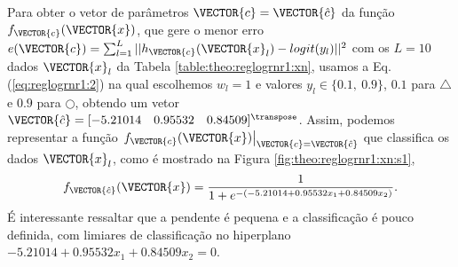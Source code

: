 \begin{SolutionT}\label{sol:theo:reglogrnr1:s1}
Para obter o vetor de parâmetros $\VECTOR{c}=\VECTOR{\hat{c}}$ da função $f_{\VECTOR{c}}(\VECTOR{x})$, 
que gere o menor erro $e(\VECTOR{c}) =  \sum_{l=1}^{L} ||h_{\VECTOR{c}}(\VECTOR{x}_l)-logit(y_l)||^2$
com os $L=10$ dados $\VECTOR{x}_l$ da Tabela \ref{table:theo:reglogrnr1:xn},
usamos a Eq. (\ref{eq:reglogrnr1:2}) na qual escolhemos $w_l=1$ e valores $y_l \in \{0.1,~ 0.9\}$,
$0.1$ para $\bigtriangleup$ e $0.9$ para $\bigcirc$,
obtendo um vetor $\VECTOR{\hat{c}}=[-5.21014\quad 0.95532\quad 0.84509]^{\transpose}$.
Assim, podemos representar a função $\left.f_{\VECTOR{c}}(\VECTOR{x})\right|_{\VECTOR{c}=\VECTOR{\hat{c}}}$
 que classifica os dados $\VECTOR{x}_l$, 
como é mostrado na Figura \ref{fig:theo:reglogrnr1:xn:s1},
\begin{equation}
f_{\VECTOR{\hat{c}}}(\VECTOR{x})= \frac{1}{1+e^{-(-5.21014  +0.95532 x_1+ 0.84509 x_2)}}.
\end{equation}
É interessante ressaltar que a pendente é pequena e a classificação é pouco definida,
com limiares de classificação no hiperplano $-5.21014  +0.95532 x_1+ 0.84509 x_2=0$.
\end{SolutionT}

